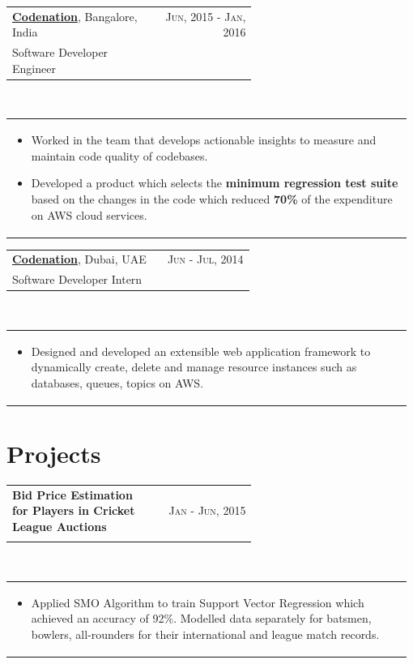 \documentclass[a4paper]{article} %
\newcommand{\verticalspacing}{-0.25cm}
\newcommand{\bulletspace}{0.7cm}
\newcommand{\projectheadspacing}{6.9cm}
\newcommand{\cproject}[5]{%
    \begin{tabular}{p{0.60\linewidth}r}
        \textcolor{smokyblack}{\small #2} & \multicolumn{1}{m{ \projectheadspacing{} }}{\raggedleft \small {\textsc{#1}}}\\
        \textcolor{payne\'sgrey}{\small #3} & \small {#4}
    \end{tabular}\\
    \begin{tabular}{p{0.98\linewidth}}
    \vspace{-0.3cm}
        \small{#5}
    \end{tabular}
    \vspace{\verticalspacing{}}
}
\begin{document}
\cproject
      {Jun, 2015 - Jan, 2016}
      {\href{http://www.codenation.co.in}{\textbf{Codenation}}, Bangalore, India}
      {Software Developer Engineer}
      {}
      {%
          \begin{itemize}[leftmargin=\bulletspace{}]
              \item Worked in the team that develops actionable insights to measure and maintain code quality of codebases.
              \item Developed a product which selects the \textbf{minimum regression test suite} based on the changes in the code which reduced \textbf{70\%} of the expenditure on AWS cloud services.
          \end{itemize}
     }
     
\cproject
      {Jun - Jul, 2014}
      {\href{http://www.codenation.co.in}{\textbf{Codenation}}, Dubai, UAE}
      {Software Developer Intern}
      {}
      {%
        \begin{itemize}[leftmargin=\bulletspace{}]
          \item Designed and developed an extensible web application framework to dynamically create, delete and manage resource instances such as databases, queues, topics on AWS.
        \end{itemize}
      }

\section{Projects}

\cproject
    {Jan - Jun, 2015}
    {\textbf{Bid Price Estimation for Players in Cricket League Auctions}}
    {\textsc{\raggedright Bachelor's Thesis Project}}
    {}
    {%
        \begin{itemize}[leftmargin=\bulletspace{}]
            \item Applied SMO Algorithm to train Support Vector Regression which achieved an accuracy of 92\%. Modelled data separately for batsmen, bowlers, all-rounders for their international and league match records.
        \end{itemize}
    }
\end{document}
